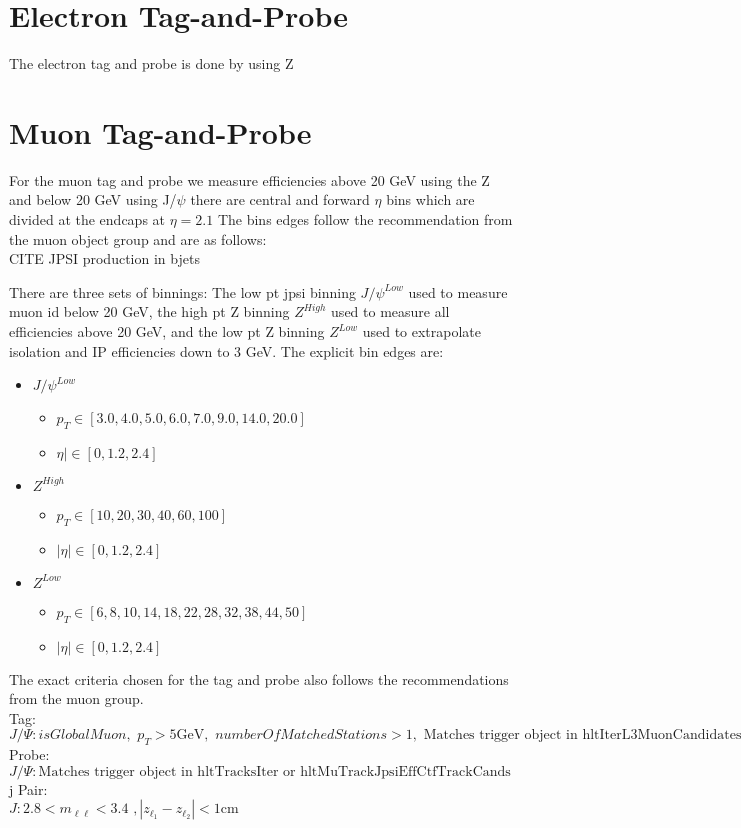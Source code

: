 \section{Electron Tag-and-Probe }

The electron tag and probe is done by using Z

\section{Muon Tag-and-Probe}

For the muon tag and probe we measure efficiencies above 20 GeV using the Z and below 20 GeV using J/$\psi$ there are central and forward $\eta$ bins which are divided at the endcaps at $\eta = 2.1$ The bins edges follow the recommendation from the muon object group and are as follows:\\
CITE JPSI production in bjets

There are three sets of binnings: The low pt jpsi binning $J/\psi^{Low}$ used to measure muon id below 20 GeV, the high pt Z binning $Z^{High}$ used to measure all efficiencies above 20 GeV, and the low pt Z binning $Z^{Low}$ used to extrapolate isolation and IP efficiencies down to 3 GeV.
The explicit bin edges are:
\begin{itemize}
\item $J/\psi^{Low}$  
	\begin{itemize}
		\item[] $p_T \in [3.0, 4.0,  5.0, 6.0, 7.0, 9.0, 14.0,  20.0]$
		\item[]  $\eta| \in [0, 1.2, 2.4]$
	\end{itemize}
\item $Z^{High}$
	\begin{itemize}
		\item[] $ p_T \in [10, 20, 30, 40, 60, 100]$
		\item[] $|\eta| \in [ 0, 1.2, 2.4]$
	\end{itemize}
\item $Z^{Low}$
	\begin{itemize}
		\item[] $ p_T \in [6,8,10,14,18,22,28,32,38,44,50]$ 
		\item[] $|\eta| \in [0, 1.2, 2.4]$
	\end{itemize}
\end{itemize}
The exact criteria chosen for the tag and probe also follows the recommendations from the muon group.\\
Tag:\\
$J/\Psi: isGlobalMuon, \, \, p_T>5 \text{GeV} , \, \, numberOfMatchedStations > 1, \,\, \text{Matches trigger object in hltIterL3MuonCandidates}$\\
Probe:\\
$J/\Psi: \text{Matches trigger object in hltTracksIter or hltMuTrackJpsiEffCtfTrackCands}$\\j
Pair:\\
$J: 2.8 < m_{\ell\ell} < 3.4 \, \, , | z_{\ell_1} - z_{\ell_2} | < 1 \text{cm}$


